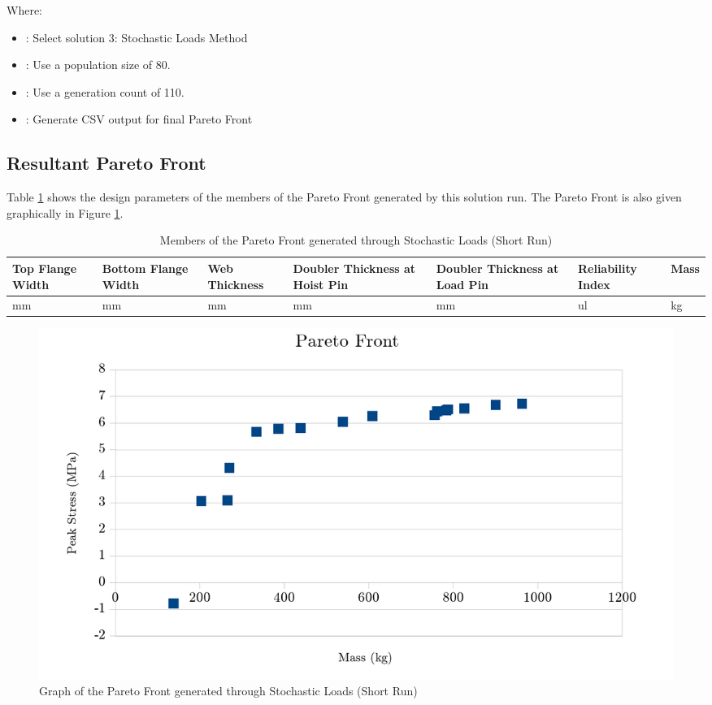\noindent Where: 

\begin{itemize}
  \item {}: Select solution 3: Stochastic Loads Method
  \item {}: Use a population size of 80. 
  \item {}: Use a generation count of 110. 
  \item {}: Generate CSV output for final Pareto Front
\end{itemize}


\subsection{Resultant Pareto Front}
Table \ref{tab:pfront_sto_short} shows the design parameters of the members of the Pareto Front generated by this solution run. The Pareto Front is also given graphically in Figure \ref{fig:pfront_sto_short}. 

\begin{table}[!htbp]
\centering
\small
\begin{tabular}{|p{1.5cm}p{1.5cm}p{1.4cm}p{2cm}p{2cm}p{1.5cm}p{1.5cm}|}
\hline
Top Flange Width&Bottom Flange Width&Web Thickness&Doubler Thickness at Hoist Pin&Doubler Thickness at Load Pin&Reliability Index& Mass\\
\hline
mm&mm&mm&mm&mm&ul&kg\\
\hline
\hline
\end{tabular}
	\caption{Members of the Pareto Front generated through Stochastic Loads (Short Run)}
\label{tab:pfront_sto_short}
\end{table}

\begin{figure}
\includegraphics[width=\textwidth]{img/s3i80g200_front.png}
	\caption{Graph of the Pareto Front generated through Stochastic Loads (Short Run)}
\label{fig:pfront_sto_short}
\end{figure}

